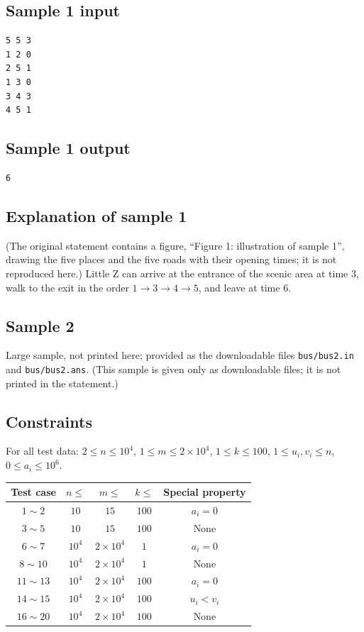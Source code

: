 \documentclass[11pt]{article}
\begin{document}
\subsection*{Sample 1 input}

\begin{verbatim}
5 5 3
1 2 0
2 5 1
1 3 0
3 4 3
4 5 1
\end{verbatim}

\subsection*{Sample 1 output}

\begin{verbatim}
6
\end{verbatim}

\subsection*{Explanation of sample 1}

(The original statement contains a figure, ``Figure 1: illustration of
sample 1'', drawing the five places and the five roads with their opening
times; it is not reproduced here.)
Little Z can arrive at the entrance of the scenic area at time $3$,
walk to the exit in the order $1 \to 3 \to 4 \to 5$,
and leave at time $6$.

\subsection*{Sample 2}

Large sample, not printed here;
provided as the downloadable files \texttt{bus/bus2.in} and \texttt{bus/bus2.ans}.
(This sample is given only as downloadable files; it is not printed in the
statement.)

\subsection*{Constraints}

For all test data: $2 \le n \le 10^4$, $1 \le m \le 2 \times 10^4$,
$1 \le k \le 100$, $1 \le u_i, v_i \le n$, $0 \le a_i \le 10^6$.

\begin{center}
\begin{tabular}{ccccc}
\toprule
Test case & $n \le$ & $m \le$ & $k \le$ & Special property \\
\midrule
$1 \sim 2$ & $10$ & $15$ & $100$ & $a_i = 0$ \\
$3 \sim 5$ & $10$ & $15$ & $100$ & None \\
$6 \sim 7$ & $10^4$ & $2 \times 10^4$ & $1$ & $a_i = 0$ \\
$8 \sim 10$ & $10^4$ & $2 \times 10^4$ & $1$ & None \\
$11 \sim 13$ & $10^4$ & $2 \times 10^4$ & $100$ & $a_i = 0$ \\
$14 \sim 15$ & $10^4$ & $2 \times 10^4$ & $100$ & $u_i < v_i$ \\
$16 \sim 20$ & $10^4$ & $2 \times 10^4$ & $100$ & None \\
\bottomrule
\end{tabular}
\end{center}
\end{document}
